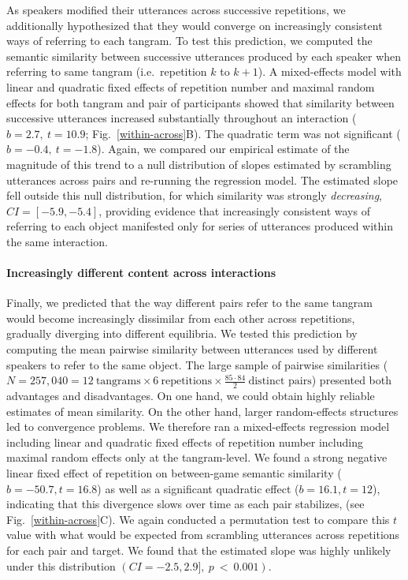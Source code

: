 As speakers modified their utterances across successive repetitions, we additionally hypothesized that they would converge on increasingly consistent ways of referring to each tangram.
To test this prediction, we computed the semantic similarity between successive utterances produced by each speaker when referring to same tangram (i.e.~repetition $k$ to $k+1$). %
A mixed-effects model with linear and quadratic fixed effects of repetition number and maximal random effects for both tangram and pair of participants showed that similarity between successive utterances increased substantially throughout an interaction ($b = 2.7,~t = 10.9$; Fig.~\ref{within-across}B). 
The quadratic term was not significant ($b= -0.4,~t=-1.8$).
Again, we compared our empirical estimate of the magnitude of this trend to a null distribution of slopes estimated by scrambling utterances across pairs and re-running the regression model.%
The estimated slope fell outside this null distribution, for which similarity was strongly \emph{decreasing}, $CI = [-5.9, -5.4]$, providing evidence that increasingly consistent ways of referring to each object manifested only for series of utterances produced within the same interaction.

\paragraph{Increasingly different content across interactions}
Finally, we predicted that the way different pairs refer to the same tangram would become increasingly dissimilar from each other across repetitions, gradually diverging into different equilibria.
We tested this prediction by computing the mean pairwise similarity between utterances used by different speakers to refer to the same object.
The large sample of pairwise similarities ($N = 257,040 = 12~\textrm{tangrams} \times 6~\textrm{repetitions} \times \frac{85 \cdot 84}{2}~\textrm{distinct pairs}$) presented both advantages and disadvantages.
On one hand, we could obtain highly reliable estimates of mean similarity. 
On the other hand, larger random-effects structures led to convergence problems.
We therefore ran a mixed-effects regression model including linear and quadratic fixed effects of repetition number including maximal random effects only at the tangram-level. 
We found a strong negative linear fixed effect of repetition on between-game semantic similarity ($b = -50.7, t= 16.8$) as well as a significant quadratic effect ($b= 16.1, t = 12$), indicating that this divergence slows over time as each pair stabilizes, (see Fig.~\ref{within-across}C).
We again conducted a permutation test to compare this $t$ value with what would be expected from scrambling utterances across repetitions for each pair and target.
We found that the estimated slope was highly unlikely under this distribution $(CI = -2.5, 2.9],~p~<~0.001)$. 


